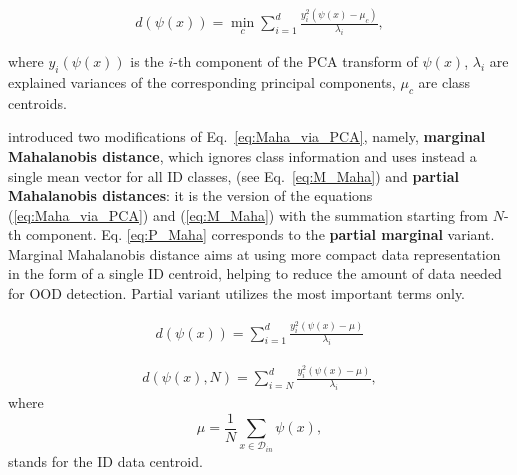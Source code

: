 \documentclass[letterpaper, final]{article} %
\begin{document}
\begin{equation}
\begin{gathered}
d(\psi(x))=\min\limits_{c}\sum\limits_{i=1}^{d}\frac{y_i^2(\psi(x) - \mu_c)}{\lambda_i},
\end{gathered}
\label{eq:Maha_via_PCA}
\end{equation}

where $y_i(\psi(x))$ is the $i$-th component of the PCA transform of $\psi(x)$, $\lambda_i$ are explained variances of the corresponding principal components, $\mu_c$ are class centroids.

\citet*{Kamoi2020WhyIT} introduced two modifications of Eq.~\ref{eq:Maha_via_PCA}, namely, {\bf marginal Mahalanobis distance}, which  ignores class information and uses instead a single mean vector for all ID classes, (see Eq.~\ref{eq:M_Maha}) and {\bf partial Mahalanobis distances}: it is the version of the equations (\ref{eq:Maha_via_PCA}) and (\ref{eq:M_Maha}) with the summation starting from $N$-th component. Eq. \ref{eq:P_Maha} corresponds to the {\bf partial marginal} variant. Marginal Mahalanobis distance aims at using more compact data representation in the form of a single ID centroid, helping to reduce the amount of data needed for OOD detection. Partial variant utilizes  the most important terms only.

\begin{equation}
\begin{gathered}
        d(\psi(x))=\sum\limits_{i=1}^{d}\frac{y_i^2(\psi(x)-\mu)}{\lambda_i}
\end{gathered}
\label{eq:M_Maha}
\end{equation}

\begin{equation}
\begin{gathered}
        d(\psi(x), N) = \sum\limits_{i=N}^{d} \frac{y_i^2(\psi(x)-\mu)}{\lambda_i},
\end{gathered}
\label{eq:P_Maha}
\end{equation}
where
$$
\mu  = \frac{1}{N}\sum\limits_{x\in\mathcal{D}_{in}} \psi(x),
$$
stands for the ID data centroid.
\end{document}
